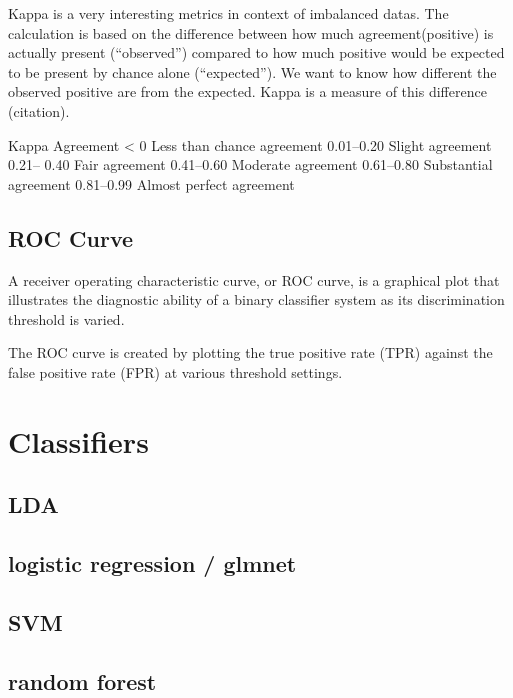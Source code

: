 \documentclass[
]{book}
\begin{document}
Kappa is a very interesting metrics in context of imbalanced datas.
The calculation is based on the difference between how much agreement(positive) is actually present (``observed'') compared to how much positive would be expected to be present by chance alone (``expected''). We want to know how different the observed positive are from the expected. Kappa is a measure of this difference (citation).

Kappa Agreement
\textless{} 0 Less than chance agreement
0.01--0.20 Slight agreement
0.21-- 0.40 Fair agreement
0.41--0.60 Moderate agreement
0.61--0.80 Substantial agreement
0.81--0.99 Almost perfect agreement

\hypertarget{roc-curve}{%
\section{ROC Curve}\label{roc-curve}}

A receiver operating characteristic curve, or ROC curve, is a graphical plot that illustrates the diagnostic ability of a binary classifier system as its discrimination threshold is varied.

The ROC curve is created by plotting the true positive rate (TPR) against the false positive rate (FPR) at various threshold settings.

\hypertarget{classifiers}{%
\chapter{Classifiers}\label{classifiers}}

\hypertarget{lda}{%
\section{LDA}\label{lda}}

\hypertarget{logistic-regression-glmnet}{%
\section{logistic regression / glmnet}\label{logistic-regression-glmnet}}

\hypertarget{svm}{%
\section{SVM}\label{svm}}

\hypertarget{random-forest}{%
\section{random forest}\label{random-forest}}
\end{document}
